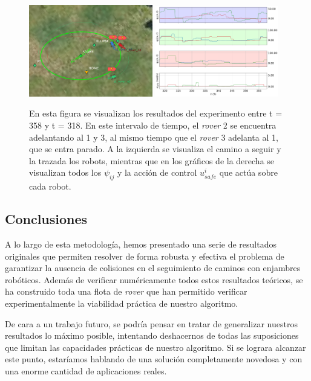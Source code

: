 \begin{figure}[h!]
    \centering
    \includegraphics[trim={0 0cm 0 0cm}, clip, width=0.48\textwidth]{fig/358.png}
    \includegraphics[trim={0 0cm 0 0cm}, clip, width=0.48\textwidth]{fig/data_358.png}
    \caption{En esta figura se visualizan los resultados del experimento entre t = 358 y t = 318. En este intervalo de tiempo, el \textit{rover} 2 se encuentra adelantando al 1 y 3, al mismo tiempo que el \textit{rover} 3 adelanta al 1, que se entra parado. A la izquierda se visualiza el camino a seguir y la trazada los robots, mientras que en los gráficos de la derecha se visualizan todos los $\psi_{ij}$ y la acción de control $u_{safe}^i$ que actúa sobre cada robot.}
    \label{fig: exp3}
\end{figure}


\vspace{-0.3cm}
\subsection{Conclusiones}

A lo largo de esta metodología, hemos presentado una serie de resultados originales que permiten resolver de forma robusta y efectiva el problema de garantizar la ausencia de colisiones en el seguimiento de caminos con enjambres robóticos. Además de verificar numéricamente todos estos resultados teóricos, se ha construido toda una flota de \textit{rover} que han permitido verificar experimentalmente la viabilidad práctica de nuestro algoritmo.

De cara a un trabajo futuro, se podría pensar en tratar de generalizar nuestros resultados lo máximo posible, intentando deshacernos de todas las suposiciones que limitan las capacidades prácticas de nuestro algoritmo. Si se lograra alcanzar este punto, estaríamos hablando de una solución completamente novedosa y con una enorme cantidad de aplicaciones reales.